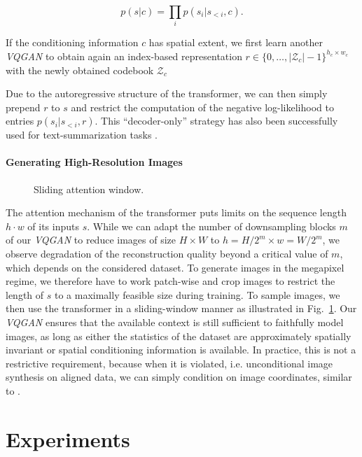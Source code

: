 \begin{equation}
  \label{eq:conddensity}
  p(s|c) = \prod_i p(s_i|s_{<i}, c).
\end{equation}

If the conditioning information $c$ has spatial extent, we first learn another \emph{VQGAN} to obtain again an index-based representation $r \in \{0, \dots, \vert \mathcal{Z}_c \vert
-1 \}^{h_c \times w_c}$ with the newly obtained codebook $\mathcal{Z}_c$

Due to the autoregressive structure of the transformer, we can then simply prepend $r$ to $s$ and restrict the computation of the negative log-likelihood to entries $p(s_i \vert s_{<i}, r)$. This ``decoder-only'' strategy has also been successfully used for text-summarization tasks \cite{liu2018generating}.

\paragraph{Generating High-Resolution Images}

\begin{figure}[th]
	\centering

    \caption{Sliding attention window.}
	\label{fig:attentionslide}
	\end{figure}

The attention mechanism of the transformer puts limits on the sequence length $h \cdot w$ of its inputs $s$. While we can adapt the number of downsampling blocks $m$ of our \emph{VQGAN} to reduce images of size $H\times W$ to $h=H/2^m
\times w=W/2^m$, we observe degradation of the reconstruction quality beyond a critical value of $m$, which depends on the considered dataset. To generate images in the megapixel regime, we therefore have to work patch-wise and crop images to restrict the length of $s$ to a maximally feasible size during training. To sample images, we then use the transformer in a sliding-window manner as illustrated in Fig.~\ref{fig:attentionslide}.
Our \emph{VQGAN} ensures that the available context is still sufficient to faithfully model images, as long as either the statistics of the dataset are approximately spatially invariant or spatial conditioning information is available. In practice, this is not a restrictive requirement, because when it is violated, i.e. unconditional image synthesis on aligned data, we can simply condition on image coordinates, similar to \cite{lin2019cocogan}.

\section{Experiments}
\label{sec:experiments}
\enlargethispage{1\baselineskip}

